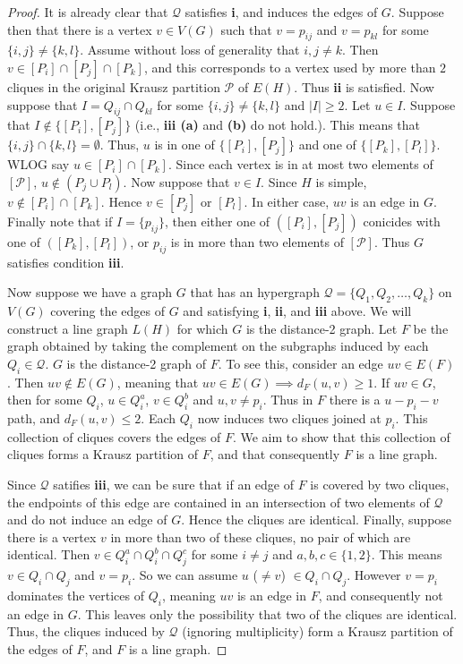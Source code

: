 \begin{proof}
It is already clear that $\mathcal{Q}$ satisfies \textbf{i}, and induces the edges of $G$.  Suppose then that there is a vertex $v \in V(G)$ such that $v = p_{ij}$ and $v = p_{kl}$ for some $\{i,j\} \neq \{k,l\}$.  Assume without loss of generality that $i,j \neq k$. Then $v \in [P_i]\cap[P_j]\cap[P_k]$, and this corresponds to a vertex used by more than $2$ cliques in the original Krausz partition $\mathcal{P}$ of $E(H)$.  Thus \textbf{ii} is satisfied.  Now suppose that $I = Q_{ij} \cap Q_{kl}$ for some $\{i,j\}\neq \{k,l\}$ and $|I| \geq 2$.  Let $u \in I$.  Suppose that $I \notin \{[P_i],[P_j]\}$ (i.e., \textbf{iii (a)} and \textbf{(b)} do not hold.).  This means that $\{i,j\}\cap \{k,l\} = \emptyset$.  Thus, $u$ is in one of $\{[P_i],[P_j]\}$ and one of $\{[P_k],[P_l]\}$. WLOG say $u\in [P_i]\cap [P_k]$.  Since each vertex is in at most two elements of $[\mathcal{P}]$, $u \notin (P_j \cup P_l)$.  Now suppose that $v \in I$.  Since $H$ is simple, $v\notin [P_i]\cap [P_k]$.  Hence $v \in [P_j]$ or $[P_l]$.  In either case, $uv$ is an edge in $G$.  Finally note that if $I = \{p_{ij}\}$, then either one of $([P_i],[P_j])$ conicides with one of $([P_k], [P_l])$, or $p_{ij}$ is in more than two elements of $[\mathcal{P}]$.  Thus $G$ satisfies condition \textbf{iii}.

Now suppose we have a graph $G$ that has an hypergraph $\mathcal{Q} =  \{Q_1, Q_2, \ldots, Q_k\}$ on $V(G)$ covering the edges of $G$ and satisfying \textbf{i}, \textbf{ii}, and \textbf{iii} above.  We will construct a line graph $L(H)$ for which $G$ is the distance-2 graph.  Let $F$ be the graph obtained by taking the complement on the subgraphs induced by each $Q_i\in \mathcal{Q}$.  $G$ is the distance-2 graph of $F$. To see this, consider an edge $uv \in E(F)$.  Then $uv \notin E(G)$, meaning that $uv \in E(G) \implies d_F(u,v) \geq 1$. If $uv \in G$, then for some $Q_i$, $u \in Q_i^a$, $v\in Q_i^b$ and $u,v \neq p_i$.  Thus in $F$ there is a $u-p_i-v$ path, and $d_F(u,v) \leq 2$.  Each $Q_i$ now induces two cliques joined at $p_i$.  This collection of cliques covers the edges of $F$.  We aim to show that  this collection of cliques forms a Krausz partition of $F$, and that consequently $F$ is a line graph.  

   Since $\mathcal{Q}$ satifies \textbf{iii}, we can be sure that if an edge of $F$ is covered by two cliques, the endpoints of this edge are contained in an intersection of two elements of $\mathcal{Q}$ and do not induce an edge of $G$.  Hence the cliques are identical.   Finally, suppose there is a vertex $v$ in more than two of these cliques, no pair of which are identical.  Then $v \in Q_i^a \cap Q_i^b \cap Q_j^c $ for some $i\neq j$ and $a,b,c \in \{1,2\}$.  This means $v \in Q_i\cap Q_j$ and $v = p_i$.  So we can assume $u$ ($\neq v$) $\in Q_i\cap Q_j$.  However $v=p_i$ dominates the vertices of $Q_i$, meaning $uv$ is an edge in $F$, and consequently not an edge in $G$.  This leaves only the possibility that two of the cliques are identical.  Thus, the cliques induced by $\mathcal{Q}$ (ignoring multiplicity) form a Krausz partition of the edges of $F$, and $F$ is a line graph.

\end{proof}
